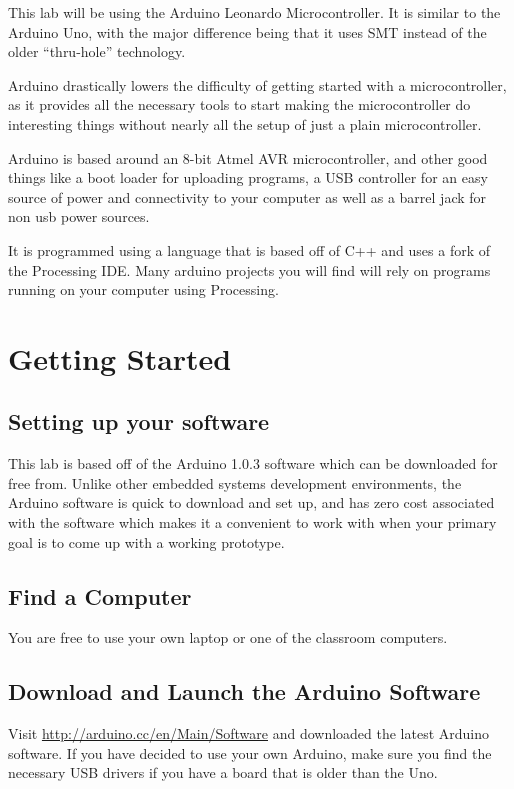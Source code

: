 \documentclass[11pt,a4paper]{article}
\begin{document}
This lab will be using the Arduino Leonardo Microcontroller\cite{leonardo}.  It is similar to the Arduino Uno\cite{uno}, with the major difference being that it uses SMT\cite{smt} instead of the older ``thru-hole''\cite{th} technology.

Arduino drastically lowers the difficulty of getting started with a microcontroller, as it provides all the necessary tools to start making the microcontroller do interesting things without nearly all the setup of just a plain microcontroller.

Arduino is based around an 8-bit Atmel AVR microcontroller, and other good things like a boot loader for uploading programs, a USB controller for an easy source of power and connectivity to your computer as well as a barrel jack for non usb power sources.

It is programmed using a language that is based off of C++ and uses a fork of the Processing IDE.  Many arduino projects you will find will rely on programs running on your computer using Processing.\cite{processing}




\section{Getting Started} %
\label{sec:getting_started}

\subsection{Setting up your software} %

This lab is based off of the Arduino 1.0.3 software which can be downloaded for free from\cite{arduino-dl}.  Unlike other embedded systems development environments, the Arduino software is quick to download and set up, and has zero cost associated with the software which makes it a convenient to work with when your primary goal is to come up with a working prototype.

\subsection{Find a Computer} %
\label{sub:find_a_computer}
You are free to use your own laptop or one of the classroom computers.


\subsection{Download and Launch the Arduino Software} %
\label{sub:download_and_launch_the_arduino_software}
Visit \url{http://arduino.cc/en/Main/Software} and downloaded the latest Arduino software\cite{arduino-dl}.  If you have decided to use your own Arduino, make sure you find the necessary USB drivers if you have a board that is older than the Uno.
\end{document}
